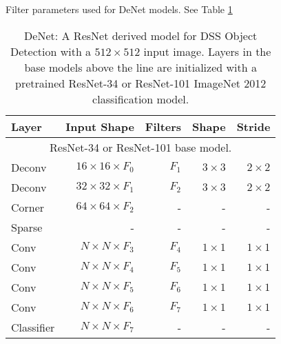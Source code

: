 \documentclass[10pt,twocolumn]{article}
\begin{document}
\begin{table}[tb] 
\begin{center}
\end{center}
\caption{Filter parameters used for DeNet models. See Table \ref{table:model_desc}}
\label{table:model_filters}

\begin{center}
\begin{tabular}{ l | r | r | r | r}
Layer & Input Shape &  Filters & Shape & Stride\\
\hline
\multicolumn{5}{c}{
ResNet-34 or ResNet-101\cite{resnet} base model.} \\
\hline
Deconv & $16\times 16\times F_0$ & $F_1$ & $3\times 3$ & $2\times 2$ \\
Deconv & $32\times 32\times F_1$ & $F_2$ & $3\times 3$ & $2\times 2$ \\
Corner & $64\times 64\times F_2$ & - & -  &- \\
Sparse & - & - &- & - \\ 
Conv  & $N\times N\times F_3$ & $F_4$ & $1\times 1$  & $1\times 1$ \\ 
Conv  & $N\times N\times F_4$ & $F_5$ & $1\times 1$  & $1\times 1$ \\ 
Conv & $N\times N\times F_5$ & $F_6$ & $1\times 1$  & $1\times 1$ \\ 
Conv  & $N\times N\times F_6$ & $F_7$ & $1\times 1$  & $1\times 1$ \\ 
Classifier & $N\times N\times F_7$ & - & - & - \\
\end{tabular}
\end{center}
\caption{DeNet: A ResNet derived model for DSS Object Detection with a $512 \times 512$ input image. Layers in the base models above the line are initialized with a pretrained ResNet-34 or ResNet-101 ImageNet 2012 classification model.}
\label{table:model_desc}
\end{table}
\end{document}
